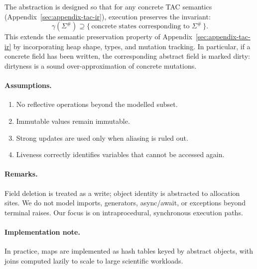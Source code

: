 The abstraction is designed so that for any concrete TAC semantics
(Appendix~\ref{sec:appendix-tac-ir}),
execution preserves the invariant:
\[
\gamma(\Sigma^\#) \supseteq
\{\, \text{concrete states corresponding to }\Sigma^\# \,\}.
\]
This extends the semantic preservation property of
Appendix~\ref{sec:appendix-tac-ir} by incorporating heap shape,
types, and mutation tracking.
In particular, if a concrete field has been written,
the corresponding abstract field is marked dirty:
dirtyness is a sound over-approximation of concrete mutations.

\paragraph{Assumptions.}
\begin{enumerate}
  \item No reflective operations beyond the modelled subset.
  \item Immutable values remain immutable.
  \item Strong updates are used only when aliasing is ruled out.
  \item Liveness correctly identifies variables that cannot be accessed again.
\end{enumerate}

\paragraph{Remarks.}
Field deletion is treated as a write; object identity is abstracted to allocation sites.
We do not model imports, generators, async/await, or exceptions beyond terminal raises.
Our focus is on intraprocedural, synchronous execution paths.

\paragraph{Implementation note.}
In practice, maps are implemented as hash tables keyed by abstract objects,
with joins computed lazily to scale to large scientific workloads.
